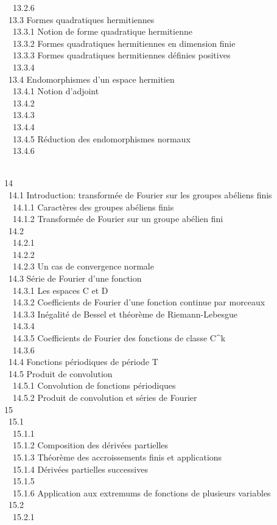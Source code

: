 \documentclass[]{article}
\begin{document}
~~13.2.6 
\\ ~13.3 {Formes quadratiques
hermitiennes} \\ ~~13.3.1 {Notion
de forme quadratique hermitienne} \\ ~~13.3.2
{Formes quadratiques hermitiennes
en dimension finie} \\ ~~13.3.3
{Formes quadratiques hermitiennes
définies positives} \\ ~~13.3.4
 \\ ~13.4
{Endomorphismes d'un espace
hermitien} \\ ~~13.4.1 {Notion
d'adjoint} \\ ~~13.4.2
 \\
~~13.4.3  \\
~~13.4.4  \\
~~13.4.5 {Réduction des
endomorphismes normaux} \\ ~~13.4.6

\\ 14  \\ ~14.1
{Introduction: transformée de
Fourier sur les groupes abéliens finis} \\ ~~14.1.1
{Caractères des groupes abéliens
finis} \\ ~~14.1.2 {Transformée
de Fourier sur un groupe abélien fini} \\ ~14.2
 \\
~~14.2.1 
\\ ~~14.2.2  \\
~~14.2.3 {Un cas de convergence
normale} \\ ~14.3 {Série de Fourier
d'une fonction} \\ ~~14.3.1 {Les
espaces C et D} \\ ~~14.3.2
{Coefficients de Fourier d'une
fonction continue par morceaux} \\ ~~14.3.3
{Inégalité de Bessel et théorème
de Riemann-Lebesgue} \\ ~~14.3.4
 \\
~~14.3.5 {Coefficients de Fourier
des fonctions de classe C^k} \\ ~~14.3.6
 \\
~14.4 {Fonctions périodiques de
période T} \\ ~14.5 {Produit de
convolution} \\ ~~14.5.1
{Convolution de fonctions
périodiques} \\ ~~14.5.2 {Produit
de convolution et séries de Fourier} \\ 15
 \\ ~15.1
 \\ ~~15.1.1
 \\
~~15.1.2 {Composition des
dérivées partielles} \\ ~~15.1.3
{Théorème des accroissements
finis et applications} \\ ~~15.1.4
{Dérivées partielles
successives} \\ ~~15.1.5
 \\ ~~15.1.6
{Application aux extremums de
fonctions de plusieurs variables} \\ ~15.2
 \\ ~~15.2.1
\end{document}
